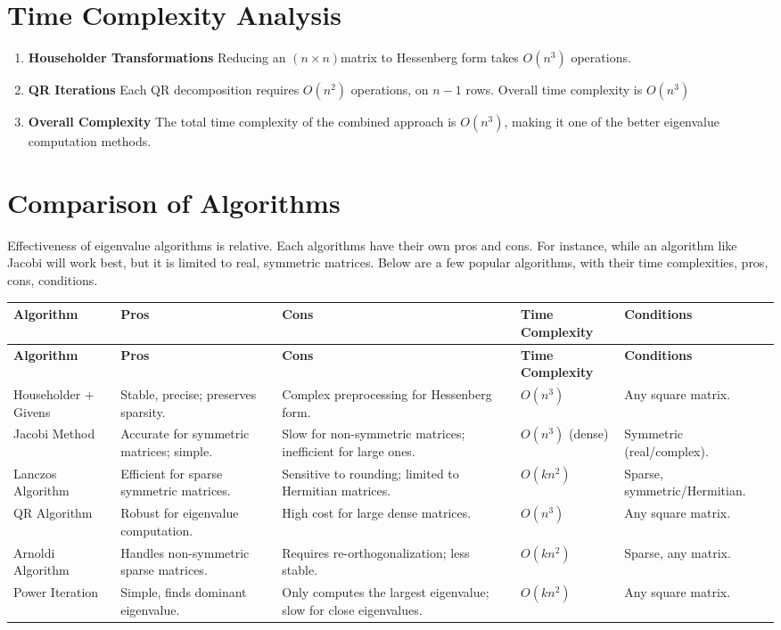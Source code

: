 \documentclass[12pt]{article}
\begin{document}
\section{Time Complexity Analysis}
\begin{enumerate}
\item{\textbf{Householder Transformations}}
Reducing an $(n \times n)$matrix to Hessenberg form takes $O(n^3)$ operations.

\item{\textbf{QR Iterations}}
Each QR decomposition requires $O(n^2)$ operations, on $n-1$ rows. Overall time complexity is $O(n^3)$ 

\item{\textbf{Overall Complexity}}
The total time complexity of the combined approach is $O(n^3)$, making it one of the better eigenvalue computation methods.
\end{enumerate}
\section{Comparison of Algorithms}

Effectiveness of eigenvalue algorithms is relative. Each algorithms have their own pros and cons. For instance, while an algorithm like Jacobi will work best, but it is limited to real, symmetric matrices. Below are a few popular algorithms, with their time complexities, pros, cons, conditions.

\begin{longtable}{|p{2.5cm}|p{3.5cm}|p{3.5cm}|p{2.5cm}|p{2.5cm}|}
\hline
\textbf{Algorithm} & \textbf{Pros} & \textbf{Cons} & \textbf{Time Complexity} & \textbf{Conditions} \\ \hline
\endfirsthead
\hline
\textbf{Algorithm} & \textbf{Pros} & \textbf{Cons} & \textbf{Time Complexity} & \textbf{Conditions} \\ \hline
\endhead
Householder + Givens & Stable, precise; preserves sparsity. & Complex preprocessing for Hessenberg form. & \( O(n^3) \) & Any square matrix. \\ \hline
Jacobi Method & Accurate for symmetric matrices; simple. & Slow for non-symmetric matrices; inefficient for large ones. & \( O(n^3) \) (dense) & Symmetric (real/complex). \\ \hline
Lanczos Algorithm & Efficient for sparse symmetric matrices. & Sensitive to rounding; limited to Hermitian matrices. & \( O(kn^2) \) & Sparse, symmetric/Hermitian. \\ \hline
QR Algorithm & Robust for eigenvalue computation. & High cost for large dense matrices. & \( O(n^3) \) & Any square matrix. \\ \hline
Arnoldi Algorithm & Handles non-symmetric sparse matrices. & Requires re-orthogonalization; less stable. & \( O(kn^2) \) & Sparse, any matrix. \\ \hline
Power Iteration & Simple, finds dominant eigenvalue. & Only computes the largest eigenvalue; slow for close eigenvalues. & \( O(kn^2) \) & Any square matrix. \\ \hline
\end{longtable}
\end{document}

